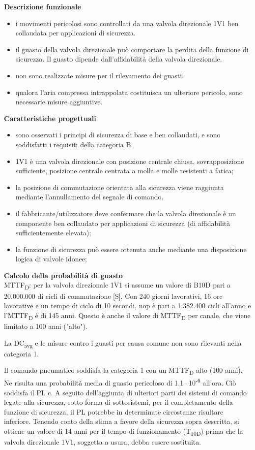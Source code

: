 \textbf{Descrizione funzionale}
\begin{itemize}
    \item i movimenti pericolosi sono controllati da una valvola direzionale 1V1 ben collaudata per applicazioni di sicurezza.
    \item il guasto della valvola direzionale può comportare la perdita della funzione di sicurezza. Il guasto dipende dall'affidabilità della valvola direzionale.
    \item non sono realizzate misure per il rilevamento dei guasti.
    \item qualora l'aria compressa intrappolata costituisca un ulteriore pericolo, sono necessarie misure aggiuntive.
\end{itemize}

\textbf{Caratteristiche progettuali}
\begin{itemize}
    \item sono osservati i principi di sicurezza di base e ben collaudati, e sono soddisfatti i requisiti della categoria B.
    \item 1V1 è una valvola direzionale con posizione centrale chiusa, sovrapposizione sufficiente, posizione centrale centrata a molla e molle resistenti a fatica;
    \item la posizione di commutazione orientata alla sicurezza viene raggiunta mediante l'annullamento del segnale di comando.
    \item il fabbricante/utilizzatore deve confermare che la valvola direzionale è un componente ben collaudato per applicazioni di sicurezza (di affidabilità sufficientemente elevata);
    \item la funzione di sicurezza può essere ottenuta anche mediante una disposizione logica di valvole idonee;
\end{itemize}

\textbf{Calcolo della probabilità di guasto}\\
MTTF\textsubscript{D}: per la valvola direzionale 1V1 si assume un valore di B10D pari a 20.000.000 di cicli di commutazione [S]. Con 240 giorni lavorativi, 16 ore lavorative e un tempo di ciclo di 10 secondi, nop è pari a 1.382.400 cicli all'anno e l'MTTF\textsubscript{D} è di 145 anni. Questo è anche il valore di MTTF\textsubscript{D} per canale, che viene limitato a 100 anni ("alto").

La DC\textsubscript{avg} e le misure contro i guasti per causa comune non sono rilevanti nella categoria 1.

Il comando pneumatico soddisfa la categoria 1 con un MTTF\textsubscript{D} alto (100 anni). Ne risulta una probabilità media di guasto pericoloso di 1,1·10\textsuperscript{-6} all'ora. Ciò soddisfa il PL c. A seguito dell'aggiunta di ulteriori parti dei sistemi di comando legate alla sicurezza, sotto forma di sottosistemi, per il completamento della funzione di sicurezza, il PL potrebbe in determinate circostanze risultare inferiore. Tenendo conto della stima a favore della sicurezza sopra descritta, si ottiene un valore di 14 anni per il tempo di funzionamento (T\textsubscript{10D}) prima che la valvola direzionale 1V1, soggetta a usura, debba essere sostituita.
\clearpage

